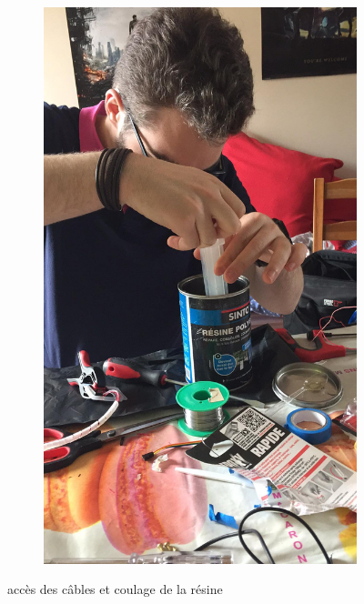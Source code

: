 \documentclass[a4paper,11pt]{report}
\begin{document}
\begin{figure}[!h]
\begin{subfigure}[b]{0.3\textwidth}
								\includegraphics[width=\textwidth]{Photos/Capture11.jpeg}
							\end{subfigure}
							\caption{accès des câbles et coulage de la résine }
					\end{figure}\newline
			
\end{document}
